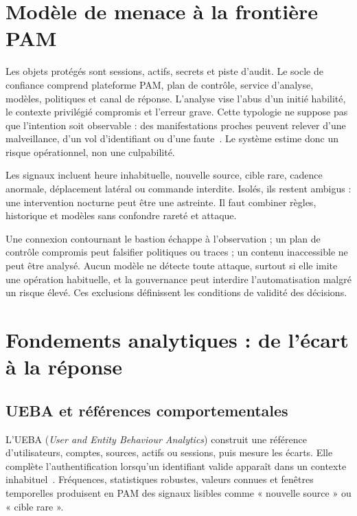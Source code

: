 \documentclass[11pt,a4paper,oneside]{report}
\theoremstyle{definition}
\theoremstyle{plain}
\begin{document}
\section{Modèle de menace à la frontière PAM}
\label{sec:domain-threat}

Les objets protégés sont sessions, actifs, secrets et piste d'audit. Le socle de confiance comprend plateforme PAM, plan de contrôle, service d'analyse, modèles, politiques et canal de réponse. L'analyse vise l'abus d'un initié habilité, le contexte privilégié compromis et l'erreur grave. Cette typologie ne suppose pas que l'intention soit observable : des manifestations proches peuvent relever d'une malveillance, d'un vol d'identifiant ou d'une faute~\cite{ref6}. Le système estime donc un risque opérationnel, non une culpabilité.

Les signaux incluent heure inhabituelle, nouvelle source, cible rare, cadence anormale, déplacement latéral ou commande interdite. Isolés, ils restent ambigus : une intervention nocturne peut être une astreinte. Il faut combiner règles, historique et modèles sans confondre rareté et attaque.

Une connexion contournant le bastion échappe à l'observation ; un plan de contrôle compromis peut falsifier politiques ou traces ; un contenu inaccessible ne peut être analysé. Aucun modèle ne détecte toute attaque, surtout si elle imite une opération habituelle, et la gouvernance peut interdire l'automatisation malgré un risque élevé. Ces exclusions définissent les conditions de validité des décisions.

\section{Fondements analytiques : de l'écart à la réponse}
\label{sec:domain-foundations}

\subsection{UEBA et références comportementales}

L'UEBA (\emph{User and Entity Behaviour Analytics}) construit une référence d'utilisateurs, comptes, sources, actifs ou sessions, puis mesure les écarts. Elle complète l'authentification lorsqu'un identifiant valide apparaît dans un contexte inhabituel~\cite{ref27}. Fréquences, statistiques robustes, valeurs connues et fenêtres temporelles produisent en PAM des signaux lisibles comme « nouvelle source » ou « cible rare ».
\end{document}
